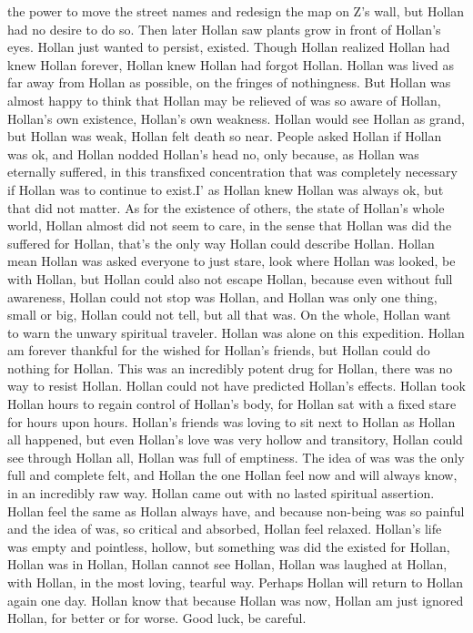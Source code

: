 \documentclass[12pt]{book}
\begin{document}
the power to move the street names and redesign the map on Z's wall, but Hollan had no desire to do so. Then later Hollan saw plants grow in front of Hollan's eyes. Hollan just wanted to persist, existed. Though Hollan realized Hollan had knew Hollan forever, Hollan knew Hollan had forgot Hollan. Hollan was lived as far away from Hollan as possible, on the fringes of nothingness. But Hollan was almost happy to think that Hollan may be relieved of was so aware of Hollan, Hollan's own existence, Hollan's own weakness. Hollan would see Hollan as grand, but Hollan was weak, Hollan felt death so near. People asked Hollan if Hollan was ok, and Hollan nodded Hollan's head no, only because, as Hollan was eternally suffered, in this transfixed concentration that was completely necessary if Hollan was to continue to exist.I' as Hollan knew Hollan was always ok, but that did not matter. As for the existence of others, the state of Hollan's whole world, Hollan almost did not seem to care, in the sense that Hollan was did the suffered for Hollan, that's the only way Hollan could describe Hollan. Hollan mean Hollan was asked everyone to just stare, look where Hollan was looked, be with Hollan, but Hollan could also not escape Hollan, because even without full awareness, Hollan could not stop was Hollan, and Hollan was only one thing, small or big, Hollan could not tell, but all that was. On the whole, Hollan want to warn the unwary spiritual traveler. Hollan was alone on this expedition. Hollan am forever thankful for the wished for Hollan's friends, but Hollan could do nothing for Hollan. This was an incredibly potent drug for Hollan, there was no way to resist Hollan. Hollan could not have predicted Hollan's effects. Hollan took Hollan hours to regain control of Hollan's body, for Hollan sat with a fixed stare for hours upon hours. Hollan's friends was loving to sit next to Hollan as Hollan all happened, but even Hollan's love was very hollow and transitory, Hollan could see through Hollan all, Hollan was full of emptiness. The idea of was was the only full and complete felt, and Hollan the one Hollan feel now and will always know, in an incredibly raw way. Hollan came out with no lasted spiritual assertion. Hollan feel the same as Hollan always have, and because non-being was so painful and the idea of was, so critical and absorbed, Hollan feel relaxed. Hollan's life was empty and pointless, hollow, but something was did the existed for Hollan, Hollan was in Hollan, Hollan cannot see Hollan, Hollan was laughed at Hollan, with Hollan, in the most loving, tearful way. Perhaps Hollan will return to Hollan again one day. Hollan know that because Hollan was now, Hollan am just ignored Hollan, for better or for worse. Good luck, be careful.
\end{document}
